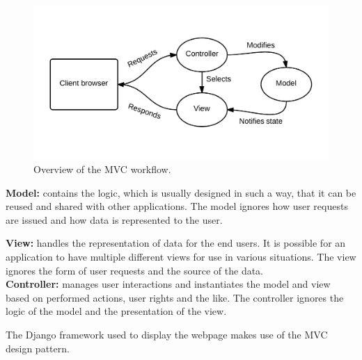 \begin{figure}[ht]
\includegraphics[width=\textwidth]{img/mvc.png}
\caption{Overview of the MVC workflow.}
\label{fig:mvc}
\end{figure}

\textbf{Model:} contains the logic, which is usually designed in such a way, that it can be reused and shared with other applications.
The model ignores how user requests are issued and how data is represented to the user.\newline

\textbf{View:} handles the representation of data for the end users.
It is possible for an application to have multiple different views for use in various situations.
The view ignores the form of user requests and the source of the data.\\

\textbf{Controller:} manages user interactions and instantiates the model and view based on performed actions, user rights and the like.
The controller ignores the logic of the model and the presentation of the view.

The Django framework used to display the webpage makes use of the MVC design pattern.